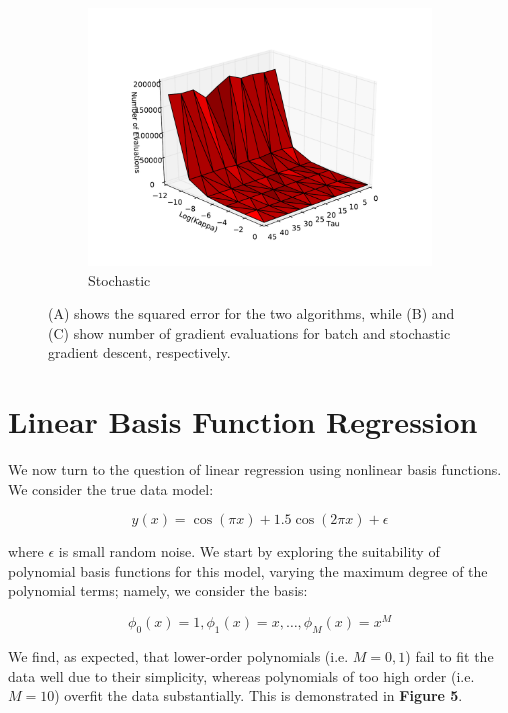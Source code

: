 \documentclass[psamsfonts]{amsart}
\theoremstyle{definition}
\theoremstyle{remark}
\numberwithin{equation}{section}
\begin{document}
\begin{figure}
\begin{subfigure}[b]{0.48\textwidth}
			\includegraphics[width=\textwidth]{hw1_1-3_timeSGD.pdf}
			\caption{Stochastic}
		\end{subfigure}			
	\caption{(A) shows the squared error for the two algorithms, while (B) and (C) show number of gradient evaluations for batch and stochastic gradient descent, respectively.}
\end{figure}

\section{Linear Basis Function Regression}

We now turn to the question of linear regression using nonlinear basis functions. We consider the true data model:

$$y(x) = \cos(\pi x) + 1.5 \cos(2\pi x) + \epsilon$$

where $\epsilon$ is small random noise. We start by exploring the suitability of polynomial basis functions for this model, varying the maximum degree of the polynomial terms; namely, we consider the basis:

$$\phi_0(x) = 1, \phi_1(x) = x, \dots, \phi_M(x) = x^M$$

We find, as expected, that lower-order polynomials (i.e. $M = 0, 1$) fail to fit the data well due to their simplicity, whereas polynomials of too high order (i.e. $M = 10$) overfit the data substantially. This is demonstrated in {\bf Figure 5}.
\end{document}
